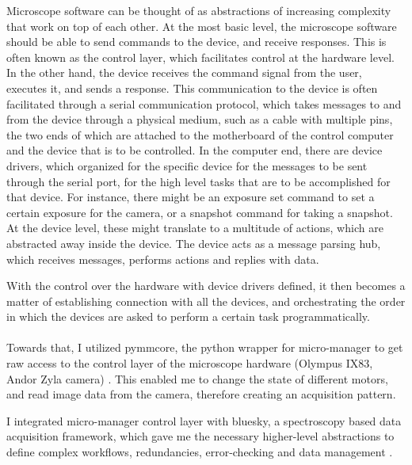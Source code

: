 Microscope software can be thought of as abstractions of increasing complexity that work on top of each other. At the most basic level, the microscope software should be able to send commands to the device, and receive responses. This is often known as the control layer, which facilitates control at the hardware level. In the other hand, the device receives the command signal from the user, executes it, and sends a response. This communication to the device is often facilitated through a serial communication protocol, which takes messages to and from the device through a physical medium, such as a cable with multiple pins, the two ends of which are attached to the motherboard of the control computer and the device that is to be controlled. In the computer end, there are device drivers, which organized for the specific device for the messages to be sent through the serial port, for the high level tasks that are to be accomplished for that device. For instance, there might be an exposure set command to set a certain exposure for the camera, or a snapshot command for taking a snapshot. At the device level, these might translate to a multitude of actions, which are abstracted away inside the device. The device acts as a message parsing hub, which receives messages, performs actions and replies with data.

With the control over the hardware with device drivers defined, it then becomes a matter of establishing connection with all the devices, and orchestrating the order in which the devices are asked to perform a certain task programmatically. 


\paragraph*{} Towards that, I utilized pymmcore, the python wrapper for micro-manager to get raw access to the control layer of the microscope hardware (Olympus IX83, Andor Zyla camera) \cite{edelstein2014advanced}. This enabled me to change the state of different motors, and read image data from the camera, therefore creating an acquisition pattern.

I integrated micro-manager control layer with bluesky, a spectroscopy based data acquisition framework, which gave me the necessary higher-level abstractions to define complex workflows, redundancies, error-checking and data management \cite{allan2019bluesky}.

